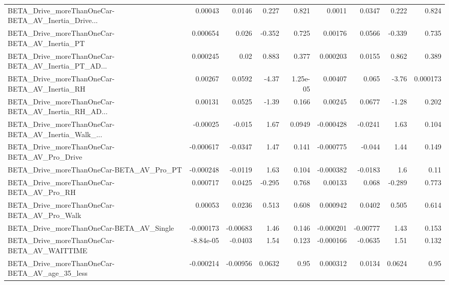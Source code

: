 \begin{tabular}{lrrrrrrrr}
BETA\_Drive\_moreThanOneCar-BETA\_AV\_Inertia\_Drive... &     0.00043 &       0.0146 &    0.227 &    0.821 &     0.0011 &      0.0347 &        0.222 &         0.824 \\
BETA\_Drive\_moreThanOneCar-BETA\_AV\_Inertia\_PT       &    0.000654 &        0.026 &   -0.352 &    0.725 &    0.00176 &      0.0566 &       -0.339 &         0.735 \\
BETA\_Drive\_moreThanOneCar-BETA\_AV\_Inertia\_PT\_AD... &    0.000245 &         0.02 &    0.883 &    0.377 &   0.000203 &      0.0155 &        0.862 &         0.389 \\
BETA\_Drive\_moreThanOneCar-BETA\_AV\_Inertia\_RH       &     0.00267 &       0.0592 &    -4.37 & 1.25e-05 &    0.00407 &       0.065 &        -3.76 &      0.000173 \\
BETA\_Drive\_moreThanOneCar-BETA\_AV\_Inertia\_RH\_AD... &     0.00131 &       0.0525 &    -1.39 &    0.166 &    0.00245 &      0.0677 &        -1.28 &         0.202 \\
BETA\_Drive\_moreThanOneCar-BETA\_AV\_Inertia\_Walk\_... &    -0.00025 &       -0.015 &     1.67 &   0.0949 &  -0.000428 &     -0.0241 &         1.63 &         0.104 \\
BETA\_Drive\_moreThanOneCar-BETA\_AV\_Pro\_Drive        &   -0.000617 &      -0.0347 &     1.47 &    0.141 &  -0.000775 &      -0.044 &         1.44 &         0.149 \\
BETA\_Drive\_moreThanOneCar-BETA\_AV\_Pro\_PT           &   -0.000248 &      -0.0119 &     1.63 &    0.104 &  -0.000382 &     -0.0183 &          1.6 &          0.11 \\
BETA\_Drive\_moreThanOneCar-BETA\_AV\_Pro\_RH           &    0.000717 &       0.0425 &   -0.295 &    0.768 &    0.00133 &       0.068 &       -0.289 &         0.773 \\
BETA\_Drive\_moreThanOneCar-BETA\_AV\_Pro\_Walk         &     0.00053 &       0.0236 &    0.513 &    0.608 &   0.000942 &      0.0402 &        0.505 &         0.614 \\
BETA\_Drive\_moreThanOneCar-BETA\_AV\_Single           &   -0.000173 &     -0.00683 &     1.46 &    0.146 &  -0.000201 &    -0.00777 &         1.43 &         0.153 \\
BETA\_Drive\_moreThanOneCar-BETA\_AV\_WAITTIME         &   -8.84e-05 &      -0.0403 &     1.54 &    0.123 &  -0.000166 &     -0.0635 &         1.51 &         0.132 \\
BETA\_Drive\_moreThanOneCar-BETA\_AV\_age\_35\_less      &   -0.000214 &     -0.00956 &   0.0632 &     0.95 &   0.000312 &      0.0134 &       0.0624 &          0.95 \\

\end{tabular}
